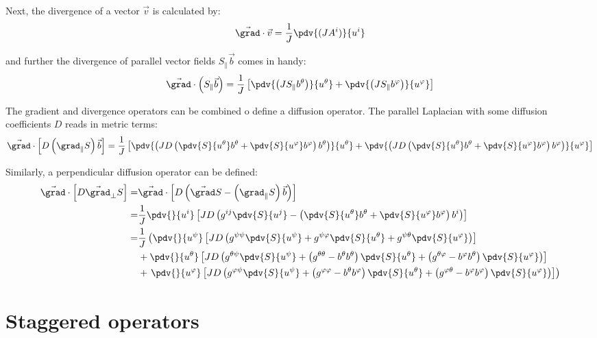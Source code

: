 Next, the divergence of a vector $\vec{v}$ is calculated by: 
\begin{align}
	\vec{\grad}\cdot\vec{v} = \frac{1}{J}\pdv{(JA^i)}{u^i} \label{eq:MetricDivergence}
\end{align}

and further the divergence of parallel vector fields $S_\parallel\vec{b}$ comes in handy: 
\begin{align}
	\vec{\grad}\cdot \left(S_\parallel\vec{b}\right) = \frac{1}{J}\left[\pdv{\left(J S_\parallel b^\theta\right)}{u^\theta} + \pdv{\left(J S_\parallel b^\varphi\right)}{u^\varphi}\right] \label{eq:MetricDivergenceParallel}
\end{align}

The gradient and divergence operators can be combined o define a diffusion operator. The parallel Laplacian with some diffusion coefficients $D$ reads in metric terms: 
\begin{align}
	\label{eq:MetricParallelDiffusion}
	\vec{\grad}\cdot\left[D\left(\grad_\parallel S\right)\vec{b}\right] = \frac{1}{J}\left[\pdv{\left(JD \left(\pdv{S}{u^\theta}b^\theta + \pdv{S}{u^\varphi}b^\varphi\right) b^\theta\right)}{u^\theta} + \pdv{\left(JD\left(\pdv{S}{u^\theta}b^\theta + \pdv{S}{u^\varphi}b^\varphi\right) b^\varphi\right)}{u^\varphi}\right]
\end{align}

Similarly, a perpendicular diffusion operator can be defined: 
\begin{align}
	\vec{\grad}\cdot\left[D\vec{\grad}_\perp S\right] =& \vec{\grad}\cdot\left[D\left(\vec{\grad} S - \left(\grad_\parallel S\right)\vec{b}\right)\right] \nonumber \\
	=& \frac{1}{J}\pdv{}{u^i}\left[JD\left(g^{ij}\pdv{S}{u^j} - \left(\pdv{S}{u^\theta}b^\theta + \pdv{S}{u^\varphi}b^\varphi\right)b^i\right)\right] \nonumber \\
	=& \frac{1}{J}\left(\pdv{}{u^\psi}\left[JD\left(g^{\psi\psi}\pdv{S}{u^\psi} + g^{\psi\varphi}\pdv{S}{u^\theta} + g^{\psi\theta}\pdv{S}{u^\varphi}\right)\right]      \right.\nonumber \\
	&+ \pdv{}{u^\theta}\left[JD\left(g^{\theta\psi}\pdv{S}{u^\psi} + \left(g^{\theta\theta} - b^\theta b^\theta\right)\pdv{S}{u^\theta} + \left(g^{\theta\varphi} - b^\varphi b^\theta\right)\pdv{S}{u^\varphi}\right)\right] \nonumber \\
	&+ \left. \pdv{}{u^\varphi}\left[JD\left(g^{\varphi\psi}\pdv{S}{u^\psi} + \left(g^{\varphi\varphi} - b^\theta b^\varphi\right)\pdv{S}{u^\theta} + \left(g^{\varphi\theta} - b^\varphi b^\varphi\right)\pdv{S}{u^\varphi}\right)\right]\right) \label{eq:MetricPerpendicularDiffusion}
\end{align}


\section{Staggered operators}
